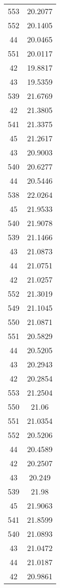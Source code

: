 \begin{tabular}[c]{|c|c|}
       553&   20.2077\\
       552&   20.1405\\
        44&   20.0465\\
       551&   20.0117\\
        42&   19.8817\\
        43&   19.5359\\
       539&   21.6769\\
        42&   21.3805\\
       541&   21.3375\\
        45&   21.2617\\
        43&   20.9003\\
       540&   20.6277\\
        44&   20.5446\\
       538&   22.0264\\
        45&   21.9533\\
       540&   21.9078\\
       539&   21.1466\\
        43&   21.0873\\
        44&   21.0751\\
        42&   21.0257\\
       552&   21.3019\\
       549&   21.1045\\
       550&   21.0871\\
       551&   20.5829\\
        44&   20.5205\\
        43&   20.2943\\
        42&   20.2854\\
       553&   21.2504\\
       550&     21.06\\
       551&   21.0354\\
       552&   20.5206\\
        44&   20.4589\\
        42&   20.2507\\
        43&    20.249\\
       539&     21.98\\
        45&   21.9063\\
       541&   21.8599\\
       540&   21.0893\\
        43&   21.0472\\
        44&   21.0187\\
        42&   20.9861\\
\end{tabular}
